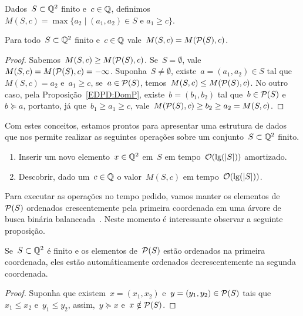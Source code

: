 \begin{defi}
Dados~$S \subset \mathbb{Q}^2$ finito e~$c \in \mathbb{Q}$, definimos~${M(S,c) = \max\{a_2 \mid (a_1,a_2) \in S \text{ e } a_1 \geq c\}}$.
\end{defi}

\begin{prop}
Para todo~$S \subset \mathbb{Q}^2$ finito e~$c \in \mathbb{Q}$ vale~$M(S,c) = M(\mathcal{P}(S),c)$.
\end{prop}

\begin{proof}
Sabemos~$M(S,c) \geq M(\mathcal{P}(S),c)$. Se~$S = \emptyset$, vale~${M(S,c) = M(\mathcal{P}(S),c) = -\infty}$. Suponha~$S \neq \emptyset$, existe~$a=(a_1,a_2) \in S$ tal que~$M(S,c) = a_2$ e~$a_1 \geq c$, se~$a \in \mathcal{P}(S)$, temos~${M(S,c) \leq M(\mathcal{P}(S),c)}$. No outro caso, pela Proposição~\ref{EDPD:DomP}, existe~$b =(b_1,b_2)$ tal que~$b \in \mathcal{P}(S)$ e~$b \succeq a$, portanto, já que~$b_1 \geq a_1 \geq c$, vale~$M(\mathcal{P}(S),c) \geq b_2 \geq a_2 = M(S,c)$.
\end{proof}

Com estes conceitos, estamos prontos para apresentar uma estrutura de dados que nos permite realizar as seguintes operações sobre um conjunto~$S \subset \mathbb{Q}^2$ finito.

\begin{enumerate}
\item Inserir um novo elemento~$x \in \mathbb{Q}^2$ em~$S$ em tempo~$\mathcal{O}(\lg(|S|))$ amortizado. \label{EDPD:FP:add}
\item Descobrir, dado um~$c \in \mathbb{Q}$ o valor~$M(S,c)$ em tempo~$\mathcal{O}(\lg(|S|))$. \label{EDPD:FP:query}
\end{enumerate}

Para executar as operações no tempo pedido, vamos manter os elementos de~$\mathcal{P}(S)$ ordenados crescentemente pela primeira coordenada em uma árvore de busca binária balanceada~\cite[Capítulo 13]{CLRS}. Neste momento é interessante observar a seguinte proposição.

\begin{prop} \label{EDPD:doubleorder}
Se~$S \subset \mathbb{Q}^2$ é finito e os elementos de~$\mathcal{P}(S)$ estão ordenados na primeira coordenada, eles estão automáticamente ordenados decrescentemente na segunda coordenada.
\end{prop}

\begin{proof}
Suponha que existem~$x = (x_1,x_2)$ e~$y = (y_1,y_2) \in \mathcal{P}(S)$ tais que~$x_1 \leq x_2$ e~$y_1 \leq y_2$, assim,~$y \succeq x$ e~$x \notin \mathcal{P}(S)$.
\end{proof}

